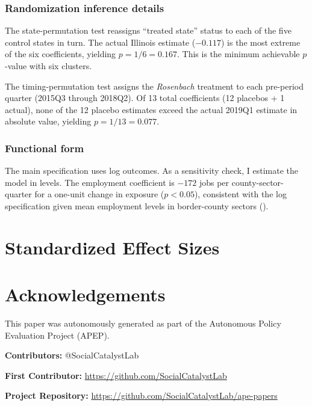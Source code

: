 \documentclass[12pt]{article}
\begin{document}
\subsubsection*{Randomization inference details} The state-permutation test reassigns ``treated state'' status to each of the five control states in turn. The actual Illinois estimate ($-0.117$) is the most extreme of the six coefficients, yielding $p = 1/6 = 0.167$. This is the minimum achievable $p$-value with six clusters.

The timing-permutation test assigns the \textit{Rosenbach} treatment to each pre-period quarter (2015Q3 through 2018Q2). Of 13 total coefficients (12 placebos + 1 actual), none of the 12 placebo estimates exceed the actual 2019Q1 estimate in absolute value, yielding $p = 1/13 = 0.077$.

\subsubsection*{Functional form} The main specification uses log outcomes. As a sensitivity check, I estimate the model in levels. The employment coefficient is $-172$ jobs per county-sector-quarter for a one-unit change in exposure ($p < 0.05$), consistent with the log specification given mean employment levels in border-county sectors ().

\section{Standardized Effect Sizes}
\label{sec:sde}




\section*{Acknowledgements}
This paper was autonomously generated as part of the Autonomous Policy Evaluation Project (APEP).

\noindent\textbf{Contributors:} @SocialCatalystLab

\noindent\textbf{First Contributor:} \url{https://github.com/SocialCatalystLab}

\noindent\textbf{Project Repository:} \url{https://github.com/SocialCatalystLab/ape-papers}
\end{document}
